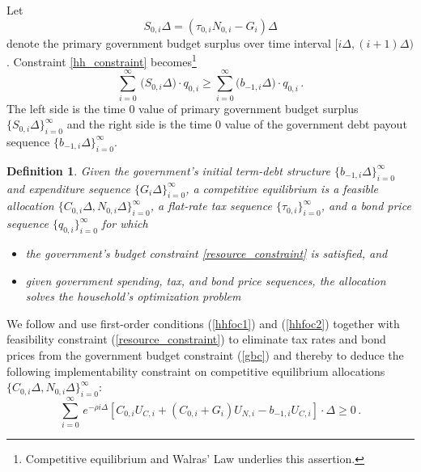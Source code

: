\documentclass[12pt]{article}
\newtheorem{definition}{Definition}
\newcommand{\WJ}[1]{{\textcolor{red}{#1}}}
\newcommand{\TS}[1]{{\textcolor{magenta}{#1}}}
\begin{document}
%
Let 
\begin{equation} \label{S0i} 
	S_{0, i}\Delta=\left(\tau_{0, i}N_{0, i}-G_{i}\right)\Delta
\end{equation} 
denote the primary government budget surplus over time interval $[i \Delta, (i+1)\Delta )$. Constraint \eqref{hh_constraint} becomes\footnote{Competitive equilibrium and Walras' Law underlies
	this assertion.} 
\begin{equation} \label{gbc} %
	\sum_{i=0}^\infty \, \big(S_{0, i}  \Delta \big) \cdot
	q_{0, i} \geq \sum_{i=0}^\infty \big( b_{-1, i}\Delta \big) \cdot q_{0, i}\,.
\end{equation}
The left side is the time $0$ value of primary government budget surplus $\{{S_{0, i}\Delta}\}_{i=0}^\infty$ and the right side is the  time $0$ value of the government debt  payout sequence  $\{b_{-1, i}\Delta\}_{i=0}^\infty$. 

\begin{definition}
	Given the government's initial  term-debt structure  $\{b_{-1, i}\Delta\}_{i=0}^\infty$ and  expenditure sequence $\{G_{i}\Delta\}_{i=0}^\infty$, a competitive equilibrium is a feasible  allocation $\{C_{0, i}\Delta, N_{0, i}\Delta\}_{i=0}^\infty$, %
	a flat-rate tax sequence $\{\tau_{0, i} \}_{i=0}^\infty$,  and a bond price sequence $\{q_{0, i}\}_{i=0}^\infty$ for which	\begin{itemize}
		\item  the government's budget constraint \eqref{resource_constraint} is satisfied, and 
		\item  given  government spending,  tax, and bond price sequences, the allocation solves the household's optimization problem
	\end{itemize}
\end{definition}


We follow \cite{LucasStokey1983} and use first-order conditions (\ref{hhfoc1}) and (\ref{hhfoc2}) together with feasibility constraint (\ref{resource_constraint}) to eliminate tax rates and bond prices from the government budget constraint (\ref{gbc}) and thereby to deduce the following implementability constraint on competitive equilibrium allocations $\{C_{0, i}\Delta, N_{0, i}\Delta\}_{i=0}^\infty$:
\begin{equation} \label{impletconstraint}
	\sum_{i=0}^\infty \, e^{-\rho i\Delta} \left[ C_{0, i}U_{C, i}+(C_{0, i}+G_{i})U_{N, i} - b_{-1, i} U_{C, i} \right]\cdot\Delta \geq 0 \,.
\end{equation}
\end{document}
